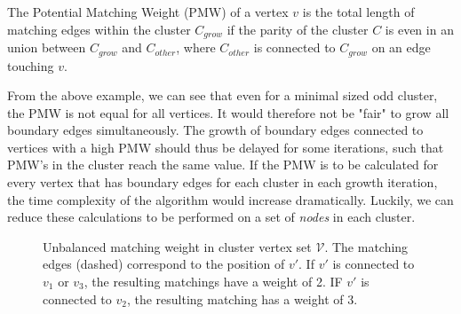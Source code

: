 \begin{lemma}
  The Potential Matching Weight (PMW) of a vertex $v$ is the total length of matching edges within the cluster $C_{grow}$ if the parity of the cluster $C$ is even in an union between $C_{grow}$ and $C_{other}$, where $C_{other}$ is connected to $C_{grow}$ on an edge touching $v$.
\end{lemma}

From the above example, we can see that even for a minimal sized odd cluster, the PMW is not equal for all vertices. It would therefore not be "fair" to grow all boundary edges simultaneously. The growth of boundary edges connected to vertices with a high PMW should thus be delayed for some iterations, such that PMW's in the cluster reach the same value. If the PMW is to be calculated for every vertex that has boundary edges for each cluster in each growth iteration, the time complexity of the algorithm would increase dramatically. Luckily, we can reduce these calculations to be performed on a set of \emph{nodes} in each cluster.

\begin{figure}[h]
  \centering
  \vspace{1em}
  \caption{Unbalanced matching weight in cluster vertex set $\mathcal{V}$. The matching edges (dashed) correspond to the position of $v'$. If $v'$ is connected to $v_1$ or $v_3$, the resulting matchings have a weight of 2. IF $v'$ is connected to $v_2$, the resulting matching has a weight of 3.}\label{fig:PMW}
\end{figure}

